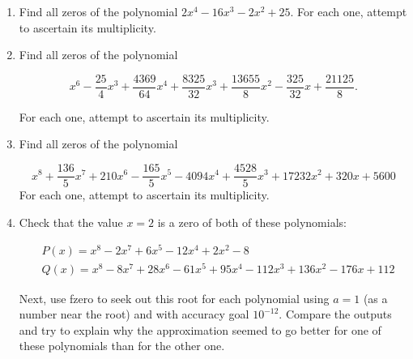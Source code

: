 \documentclass[../main.tex]{subfiles}
\begin{document}
\begin{enumerate}
\item Find all zeros of the polynomial $2 x^{4}-16 x^{3}-2 x^{2}+25$. For each one, attempt to ascertain its multiplicity.

\item Find all zeros of the polynomial

$$
x^{6}-\frac{25}{4} x^{3}+\frac{4369}{64} x^{4}+\frac{8325}{32} x^{3}+\frac{13655}{8} x^{2}-\frac{325}{32} x+\frac{21125}{8} .
$$

For each one, attempt to ascertain its multiplicity.

\item Find all zeros of the polynomial

$$
x^{8}+\frac{136}{5} x^{7}+210 x^{6}-\frac{165}{5} x^{5}-4094 x^{4}+\frac{4528}{5} x^{3}+17232 x^{2}+320 x+5600
$$
For each one, attempt to ascertain its multiplicity.

\item Check that the value $x=2$ is a zero of both of these polynomials:

$$
\begin{aligned}
&P(x)=x^{8}-2 x^{7}+6 x^{5}-12 x^{4}+2 x^{2}-8 \\
&Q(x)=x^{8}-8 x^{7}+28 x^{6}-61 x^{5}+95 x^{4}-112 x^{3}+136 x^{2}-176 x+112
\end{aligned}
$$

Next, use fzero to seek out this root for each polynomial using $a=1$ (as a number near the root) and with accuracy goal $10^{-12}$. Compare the outputs and try to explain why the approximation seemed to go better for one of these polynomials than for the other one.

\end{enumerate}
\end{document}
